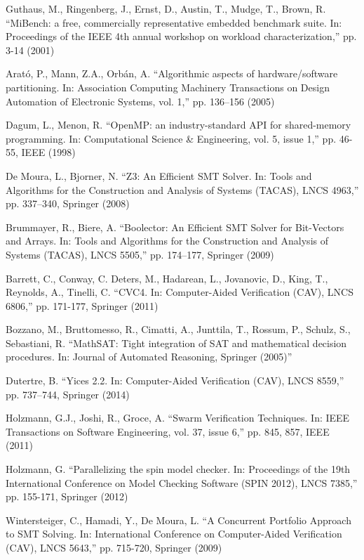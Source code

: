 \begin{thebibliography}{5}
Guthaus, M., Ringenberg, J., Ernst, D., Austin, T., Mudge, T., Brown, R. ``{MiBench: a free, commercially representative embedded benchmark suite. In: Proceedings of the IEEE 4th annual workshop on workload characterization},'' pp. 3-14 (2001)

Arat\'o, P., Mann, Z.A., Orb\'an, A. ``{Algorithmic aspects of hardware/software partitioning. In: Association Computing Machinery Transactions on Design Automation of Electronic Systems, vol. 1},'' pp. 136–156 (2005)

Dagum, L., Menon, R. ``{OpenMP: an industry-standard API for shared-memory programming. In: Computational Science \& Engineering, vol. 5, issue 1},'' pp. 46-55, IEEE (1998)

De Moura, L., Bjorner, N. ``{Z3: An Efficient SMT Solver. In: Tools and Algorithms for the Construction and Analysis of Systems (TACAS), LNCS 4963},'' pp. 337–340, Springer (2008) 

Brummayer, R., Biere, A. ``{Boolector: An Efficient SMT Solver for Bit-Vectors and Arrays. In: Tools and Algorithms for the Construction and Analysis of Systems (TACAS), LNCS 5505},'' pp. 174–177, Springer (2009)

Barrett, C., Conway, C. Deters, M., Hadarean, L., Jovanovic, D., King, T., Reynolds, A., Tinelli, C. ``{CVC4. In: Computer-Aided Verification (CAV), LNCS 6806},'' pp. 171-177, Springer (2011)

Bozzano, M., Bruttomesso, R., Cimatti, A., Junttila, T., Rossum, P., Schulz, S., Sebastiani, R. ``{MathSAT: Tight integration of SAT and mathematical decision procedures. In: Journal of Automated Reasoning, Springer (2005)}''

Dutertre, B. ``{Yices 2.2. In: Computer-Aided Verification (CAV), LNCS 8559},'' pp. 737–744, Springer (2014)

Holzmann, G.J., Joshi, R., Groce, A. ``{Swarm Verification Techniques. In: IEEE Transactions on Software Engineering, vol. 37, issue 6},'' pp. 845, 857, IEEE (2011)

Holzmann, G. ``{Parallelizing the spin model checker. In: Proceedings of the 19th International Conference on Model Checking Software (SPIN 2012), LNCS 7385},'' pp. 155-171, Springer (2012)

Wintersteiger, C., Hamadi, Y., De Moura, L. ``{A Concurrent Portfolio Approach to SMT Solving. In: International Conference on Computer-Aided Verification (CAV), LNCS 5643},'' pp. 715-720, Springer (2009)


\end{thebibliography}
